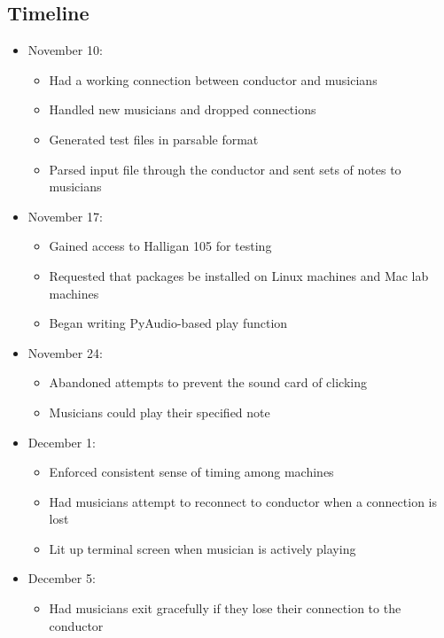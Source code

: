 \documentclass[12pt, letterpaper]{article}
\begin{document}
\subsection{Timeline}
\begin{itemize}[parsep=0pt]
\item November 10:
    \begin{itemize}
    \item Had a working connection between conductor and musicians
    \item Handled new musicians and dropped connections
    \item Generated test files in parsable format
    \item Parsed input file through the conductor and sent sets of notes to musicians
    \end{itemize}
\item November 17:
    \begin{itemize}
    \item Gained access to Halligan 105 for testing
    \item Requested that packages be installed on Linux machines and Mac lab machines
    \item Began writing PyAudio-based play function
    \end{itemize}
\item November 24:
    \begin{itemize}
    \item Abandoned attempts to prevent the sound card of clicking
    \item Musicians could play their specified note
    \end{itemize}
\item December 1:
    \begin{itemize}
    \item Enforced consistent sense of timing among machines
    \item Had musicians attempt to reconnect to conductor when a connection is lost
    \item Lit up terminal screen when musician is actively playing
    \end{itemize}
\item December 5:
    \begin{itemize}
    \item Had musicians exit gracefully if they lose their connection to the conductor
    \end{itemize}
\end{itemize}
\end{document}
